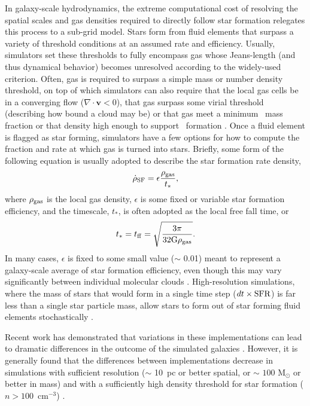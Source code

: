 In galaxy-scale hydrodynamics, the extreme computational cost of resolving the spatial scales and gas densities required to directly follow star formation relegates this process to a sub-grid model. Stars form from fluid elements that surpass a variety of threshold conditions at an assumed rate and efficiency. Usually, simulators set these thresholds to fully encompass gas whose Jeans-length (and thus dynamical behavior) becomes unresolved according to the widely-used \cite{Truelove1997} criterion. Often, gas is required to surpass a simple mass or number density threshold, on top of which simulators can also require that the local gas cells be in a converging flow ($\nabla \cdot \bm{v} < 0$), that gas surpass some virial threshold (describing how bound a cloud may be)
or that gas meet a minimum \Hmolecular~mass fraction or that density high enough to support \Hmolecular~formation \citep[e.g.][]{Kuhlen2012}.
Once a fluid element is flagged as star forming, simulators have a few options for how to compute the fraction and rate at which gas is turned into stars. Briefly, some form of the following equation is usually adopted to describe the star formation rate density,
\begin{equation}
\label{intro:eq:sfr}
 \dot{\rho}_{\rm SF} = \epsilon \frac{\rho_{\rm gas}}{t_*},
\end{equation}
where $\rho_{\rm gas}$ is the local gas density, $\epsilon$ is some fixed or variable star formation efficiency, and the timescale, $t_*$, is often adopted as the local free fall time, or
\begin{equation}
  t_* = t_{\rm ff} = \sqrt{\frac{3\pi}{32 \rm{G} \rho_{\rm gas}}}.
\end{equation}
In many cases, $\epsilon$ is fixed to some small value ($\sim$ 0.01) \citep{KrumholzTan2007} meant to represent a galaxy-scale average of star formation efficiency, even though this may vary significantly between individual molecular clouds \citep{Grudic2018}. High-resolution simulations, where the mass of stars that would form in a single time step ($dt \times \rm{SFR}$) is far less than a single star particle mass, allow stars to form out of star forming fluid elements stochastically \citep[e.g.][]{Goldbaum2015}.

Recent work has demonstrated that variations in these implementations can lead to dramatic differences in the outcome of the simulated galaxies \citep[e.g.][]{Hopkins2013,Munshi2018}. However, it is generally found that the differences between implementations decrease in simulations with sufficient resolution ($\sim$ 10~pc or better spatial, or $\sim$ $100$ M$_{\odot}$ or better in mass) and with a sufficiently high density threshold for star formation ($n > 100$~cm$^{-3}$) \citep{Orr2018,FIRE2}.

